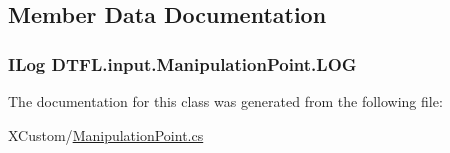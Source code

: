 \subsection{Member Data Documentation}
\subsubsection[{\texorpdfstring{L\+OG}{LOG}}]{\setlength{\rightskip}{0pt plus 5cm}I\+Log D\+T\+F\+L.\+input.\+Manipulation\+Point.\+L\+OG}\hypertarget{class_d_t_f_l_1_1input_1_1_manipulation_point_ad44ba5ddea807316cb014c68472bb6d2}{}\label{class_d_t_f_l_1_1input_1_1_manipulation_point_ad44ba5ddea807316cb014c68472bb6d2}


The documentation for this class was generated from the following file\+:\begin{DoxyCompactItemize}
\item 
X\+Custom/\hyperlink{_manipulation_point_8cs}{Manipulation\+Point.\+cs}\end{DoxyCompactItemize}
